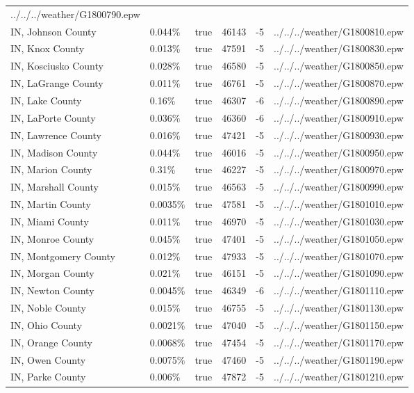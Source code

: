 \begin{longtable}[]{@{}llllll@{}}
../../../weather/G1800790.epw \\
IN, Johnson County & 0.044\% & true & 46143 & -5 &
../../../weather/G1800810.epw \\
IN, Knox County & 0.013\% & true & 47591 & -5 &
../../../weather/G1800830.epw \\
IN, Kosciusko County & 0.028\% & true & 46580 & -5 &
../../../weather/G1800850.epw \\
IN, LaGrange County & 0.011\% & true & 46761 & -5 &
../../../weather/G1800870.epw \\
IN, Lake County & 0.16\% & true & 46307 & -6 &
../../../weather/G1800890.epw \\
IN, LaPorte County & 0.036\% & true & 46360 & -6 &
../../../weather/G1800910.epw \\
IN, Lawrence County & 0.016\% & true & 47421 & -5 &
../../../weather/G1800930.epw \\
IN, Madison County & 0.044\% & true & 46016 & -5 &
../../../weather/G1800950.epw \\
IN, Marion County & 0.31\% & true & 46227 & -5 &
../../../weather/G1800970.epw \\
IN, Marshall County & 0.015\% & true & 46563 & -5 &
../../../weather/G1800990.epw \\
IN, Martin County & 0.0035\% & true & 47581 & -5 &
../../../weather/G1801010.epw \\
IN, Miami County & 0.011\% & true & 46970 & -5 &
../../../weather/G1801030.epw \\
IN, Monroe County & 0.045\% & true & 47401 & -5 &
../../../weather/G1801050.epw \\
IN, Montgomery County & 0.012\% & true & 47933 & -5 &
../../../weather/G1801070.epw \\
IN, Morgan County & 0.021\% & true & 46151 & -5 &
../../../weather/G1801090.epw \\
IN, Newton County & 0.0045\% & true & 46349 & -6 &
../../../weather/G1801110.epw \\
IN, Noble County & 0.015\% & true & 46755 & -5 &
../../../weather/G1801130.epw \\
IN, Ohio County & 0.0021\% & true & 47040 & -5 &
../../../weather/G1801150.epw \\
IN, Orange County & 0.0068\% & true & 47454 & -5 &
../../../weather/G1801170.epw \\
IN, Owen County & 0.0075\% & true & 47460 & -5 &
../../../weather/G1801190.epw \\
IN, Parke County & 0.006\% & true & 47872 & -5 &
../../../weather/G1801210.epw \\

\end{longtable}
